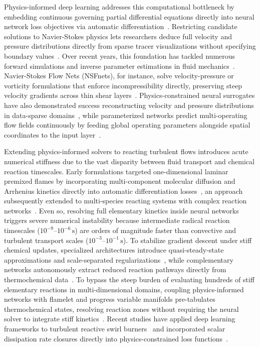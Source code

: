 \documentclass[reprint,aps,prfluids,superscriptaddress,twocolumn,floatfix]{revtex4-2}
\begin{document}
Physics-informed deep learning addresses this computational bottleneck by embedding continuous governing partial differential equations directly into neural network loss objectives via automatic differentiation~\cite{raissi2019physics}. Restricting candidate solutions to Navier-Stokes physics lets researchers deduce full velocity and pressure distributions directly from sparse tracer visualizations without specifying boundary values~\cite{raissi2020hidden}. Over recent years, this foundation has tackled numerous forward simulations and inverse parameter estimations in fluid mechanics~\cite{karniadakis2021physics, cai2021physics}. Navier-Stokes Flow Nets (NSFnets), for instance, solve velocity-pressure or vorticity formulations that enforce incompressibility directly, preserving steep velocity gradients across thin shear layers~\cite{jin2021nsfnets}. Physics-constrained neural surrogates have also demonstrated success reconstructing velocity and pressure distributions in data-sparse domains~\cite{sun2023surrogate}, while parameterized networks predict multi-operating flow fields continuously by feeding global operating parameters alongside spatial coordinates to the input layer~\cite{taassob2023physics}.

Extending physics-informed solvers to reacting turbulent flows introduces acute numerical stiffness due to the vast disparity between fluid transport and chemical reaction timescales. Early formulations targeted one-dimensional laminar premixed flames by incorporating multi-component molecular diffusion and Arrhenius kinetics directly into automatic differentiation losses~\cite{wu2024flamepinn}, an approach subsequently extended to multi-species reacting systems with complex reaction networks~\cite{wu2025physics}. Even so, resolving full elementary kinetics inside neural networks triggers severe numerical instability because intermediate radical reaction timescales ($10^{-9}\text{--}10^{-6}\,\text{s}$) are orders of magnitude faster than convective and turbulent transport scales ($10^{-3}\text{--}10^{-1}\,\text{s}$). To stabilize gradient descent under stiff chemical updates, specialized architectures introduce quasi-steady-state approximations and scale-separated regularizations~\cite{ji2021stiff}, while complementary networks autonomously extract reduced reaction pathways directly from thermochemical data~\cite{ji2021autonomous}. To bypass the steep burden of evaluating hundreds of stiff elementary reactions in multi-dimensional domains, coupling physics-informed networks with flamelet and progress variable manifolds pre-tabulates thermochemical states, resolving reaction zones without requiring the neural solver to integrate stiff kinetics~\cite{song2024flamelet}. Recent studies have applied deep learning frameworks to turbulent reactive swirl burners~\cite{mousavi2026deep} and incorporated scalar dissipation rate closures directly into physics-constrained loss functions~\cite{chaurasia2024physics}.
\end{document}
